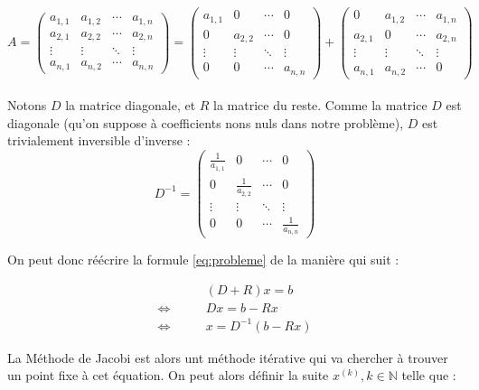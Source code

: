 \documentclass[11pt, a4paper]{article}
\begin{document}
\[
A = 
\begin{pmatrix}
    a_{1,1} & a_{1,2} & \cdots & a_{1,n} \\
    a_{2,1} & a_{2,2} & \cdots & a_{2,n} \\
    \vdots & \vdots & \ddots & \vdots \\
    a_{n,1} & a_{n,2} & \cdots & a_{n,n} 
\end{pmatrix}
=
\begin{pmatrix}
    a_{1,1} & 0 & \cdots & 0 \\
    0 & a_{2,2} & \cdots & 0 \\
    \vdots  & \vdots  & \ddots & \vdots  \\
    0 & 0 & \cdots & a_{n,n}
\end{pmatrix}
+
\begin{pmatrix}
    0 & a_{1,2} & \cdots & a_{1,n} \\
    a_{2,1} & 0 & \cdots & a_{2,n} \\
    \vdots  & \vdots  & \ddots & \vdots  \\
    a_{n,1} & a_{n,2} & \cdots & 0
\end{pmatrix}
\]\\

Notons $D$ la matrice diagonale, et $R$ la matrice du reste.
Comme la matrice $D$ est diagonale (qu'on suppose à coefficients nons nuls dans notre problème), $D$ est trivialement inversible d'inverse : \\

\[
D^{-1} =
  \begin{pmatrix}
  \frac{1}{a_{1,1}} & 0 & \cdots & 0 \\
  0 & \frac{1}{a_{2,2}} & \cdots & 0 \\
  \vdots  & \vdots  & \ddots & \vdots  \\
  0 & 0 & \cdots & \frac{1}{a_{n,n}}
 \end{pmatrix}
\]

On peut donc réécrire la formule \eqref{eq:probleme} de la manière qui suit :

\begin{align}
& (D + R)x = b\\
\Leftrightarrow \qquad & Dx = b - Rx \\
\Leftrightarrow \qquad & x = D^{-1}(b - Rx)
\end{align}

La Méthode de Jacobi est alors unt méthode itérative qui va chercher à trouver un point fixe à cet équation. On peut alors définir la suite $x^{(k)}, k \in \mathbb{N}$ telle que :
\end{document}
